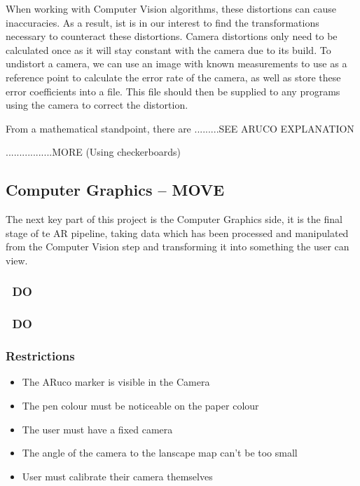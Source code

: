\documentclass[11pt]{article}
\begin{document}
When working with Computer Vision algorithms, these distortions can cause
inaccuracies. As a result, ist is in our interest to find the transformations
necessary to counteract these distortions. Camera distortions only need to be 
calculated once as it will stay constant with the camera due to its build.
To undistort a camera, we can use an image with known measurements to use
as a reference point to calculate the error rate of the camera, as well as
store these error coefficients into a file. This file should then be supplied
to any programs using the camera to correct the distortion.

From a mathematical standpoint, there are .........SEE ARUCO EXPLANATION

.................MORE (Using checkerboards)

\subsection{Computer Graphics -- MOVE}
The next key part of this project is the Computer Graphics side, it is the
final stage of te AR pipeline, taking data which has been processed and
manipulated from the Computer Vision step and transforming it into something
the user can view.
\subsubsection{~DO~}
\subsubsection{~DO~}












\subsubsection{Restrictions}
\begin{itemize}
    \item The ARuco marker is visible in the Camera
    \item The pen colour must be noticeable on the paper colour
    \item The user must have a fixed camera
    \item The angle of the camera to the lanscape map can't be too small
   	\item User must calibrate their camera themselves          
\end{itemize}
\end{document}
